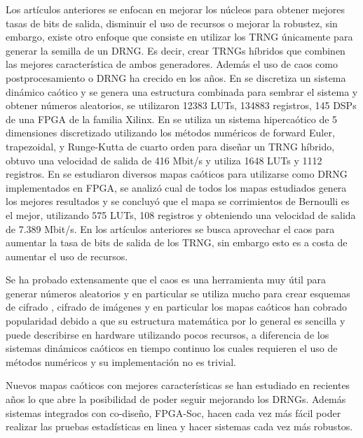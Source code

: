     Los artículos anteriores se enfocan en mejorar los núcleos para obtener mejores tasas de bits de salida, disminuir el uso de recursos o mejorar la robustez, sin embargo, existe otro enfoque que consiste en utilizar los TRNG únicamente para generar la semilla de un DRNG. Es decir, crear TRNGs híbridos que combinen las mejores característica de ambos generadores. Además el uso de caos como postprocesamiento o DRNG ha crecido en los años. En \cite{Liao2022} se discretiza un sistema dinámico caótico y se genera una estructura combinada para sembrar el sistema y obtener números aleatorios, se utilizaron 12383 LUTs, 134883 registros, 145 DSPs de una FPGA de la familia Xilinx. En \cite{Vaidyanathan2021} se utiliza un sistema hipercaótico de 5 dimensiones discretizado utilizando los métodos numéricos de forward Euler, trapezoidal, y Runge-Kutta de cuarto orden para diseñar un TRNG híbrido, obtuvo una velocidad de salida de 416 Mbit/s y utiliza 1648 LUTs y 1112 registros. En \cite{Fraga2017} se estudiaron diversos mapas caóticos para utilizarse como DRNG implementados en FPGA, se analizó cual de todos los mapas estudiados genera los mejores resultados y se concluyó que el mapa se corrimientos de Bernoulli es el mejor, utilizando 575 LUTs, 108 registros y obteniendo  una velocidad de salida de 7.389 Mbit/s. En los artículos anteriores se busca aprovechar el caos para aumentar la tasa de bits de salida de los TRNG, sin embargo esto es a costa de aumentar el uso de recursos. 

    Se ha probado extensamente que el caos es una herramienta muy útil para generar números aleatorios y en particular se utiliza mucho para crear esquemas de cifrado \cite{Wong2008,AlHazaimeh2017,Liu2020}, cifrado de imágenes \cite{Li2013, Sivaraman2020,Pareek2006,Kadir2010,Liu2016,Vaidyanathan2018,GarciaGuerrero2020} y en particular los mapas caóticos han cobrado popularidad debido a que su estructura matemática por lo general es sencilla y puede describirse en hardware utilizando pocos recursos, a diferencia de los sistemas dinámicos caóticos en tiempo continuo los cuales requieren el uso de métodos numéricos y su implementación no es trivial.

    Nuevos mapas caóticos \cite{GarciaGrimaldo2021} con mejores características se han estudiado en recientes años lo que abre la posibilidad de poder seguir mejorando los DRNGs. Además sistemas integrados con co-diseño, FPGA-Soc, \cite{HernandezMorales2022} hacen cada vez más fácil poder realizar las pruebas estadísticas en linea y hacer sistemas cada vez más robustos. 

